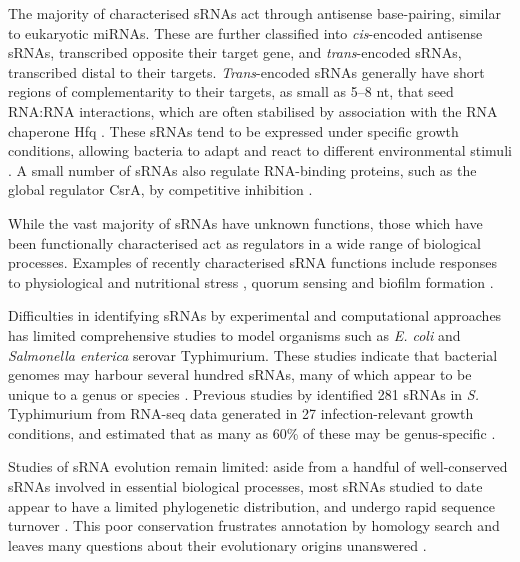 The majority of characterised sRNAs act through antisense base-pairing, similar to eukaryotic miRNAs. These are further classified into \textit{cis}-encoded antisense sRNAs, transcribed opposite their target gene, and \textit{trans}-encoded sRNAs, transcribed distal to their targets. \textit{Trans}-encoded sRNAs generally have short regions of complementarity to their targets, as small as 5--8 nt, that seed RNA:RNA interactions, which are often stabilised by association with the RNA chaperone Hfq \citep{Santiago-Frangos2018-ccc}. These sRNAs tend to be expressed under specific growth conditions, allowing bacteria to adapt and react to different environmental stimuli \citep{Gottesman2011-vx}. A small number of sRNAs also regulate RNA-binding proteins, such as the global regulator CsrA, by competitive inhibition \citep{Weilbacher2003-zu,Babitzke2007-bb,Valverde2004-tu}.

While the vast majority of sRNAs have unknown functions, those which have been functionally characterised act as regulators in a wide range of biological processes. Examples of recently characterised sRNA functions include responses to physiological \citep{Guo2014-lq,Chao2016-df} and nutritional stress \citep{Yin2018-zh}, quorum sensing \citep{Zhao2018-qxe} and biofilm formation \citep{Papenfort2015-tx,Papenfort2017-tw}. 

Difficulties in identifying sRNAs by experimental and computational approaches has limited comprehensive studies to model organisms such as \textit{E. coli} and \textit{Salmonella enterica} serovar Typhimurium. These studies indicate that bacterial genomes may harbour several hundred sRNAs, many of which appear to be unique to a genus or species \citep{Barquist2015-pa}. Previous studies by \cite{Kroger2013-pg} identified 281 sRNAs in \textit{S.} Typhimurium from RNA-seq data generated in 27 infection-relevant growth conditions, and estimated that as many as 60\% of these may be genus-specific \citep{Kroger2012-cr,Kroger2013-pg}.

Studies of sRNA evolution remain limited: aside from a handful of well-conserved sRNAs involved in essential biological processes, most sRNAs studied to date appear to have a limited phylogenetic distribution, and undergo rapid sequence turnover \citep{Skippington2012-iv,Gottesman2011-vx,Gomez-Lozano2012-xe}. This poor conservation frustrates annotation by homology search and leaves many questions about their evolutionary origins unanswered \citep{Jose2019-wi,Dutcher2018-ku,Updegrove2015-vu,Lindgreen2014-dk}.

